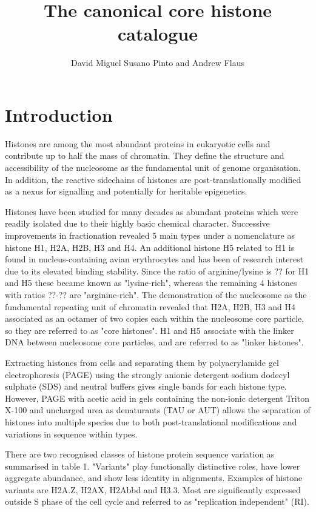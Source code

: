 \documentclass[10pt,a4paper,draft]{article}
\author{David Miguel Susano Pinto and Andrew Flaus}
\title{The canonical core histone catalogue}
\begin{document}
  \maketitle

  \section{Introduction}

Histones are among the most abundant proteins in eukaryotic cells and contribute up to half the mass of chromatin. They define the structure and accessibility of the nucleosome as the fundamental unit of genome organisation. In addition, the reactive sidechains of histones are post-translationally modified as a nexus for signalling and potentially for heritable epigenetics.

Histones have been studied for many decades as abundant proteins which were readily isolated due to their highly basic chemical character. Successive improvements in fractionation revealed 5 main types under a nomenclature as histone H1, H2A, H2B, H3 and H4. An additional histone H5 related to H1 is found in nucleus-containing avian erythrocytes and has been of research interest due to its elevated binding stability. Since the ratio of arginine/lysine is ?? for H1 and H5 these became known as "lysine-rich", whereas the remaining 4 histones with ratios ??-?? are "arginine-rich". The demonstration of the nucleosome as the fundamental repeating unit of chromatin revealed that H2A, H2B, H3 and H4 associated as an octamer of two copies each within the nucleosome core particle, so they are referred to as "core histones". H1 and H5 associate with the linker DNA between nucleosome core particles, and are referred to as "linker histones".

Extracting histones from cells and separating them by polyacrylamide gel electrophoresis (PAGE) using the strongly anionic detergent sodium dodecyl sulphate (SDS) and neutral buffers gives single bands for each histone type. However, PAGE with acetic acid in gels containing the non-ionic detergent Triton X-100 and uncharged urea as denaturants (TAU or AUT) allows the separation of histones into multiple species due to both post-translational modifications and variations in sequence within types.

There are two recognised classes of histone protein sequence variation as summarised in table 1. "Variants" play functionally distinctive roles, have lower aggregate abundance, and show less identity in alignments. Examples of histone variants are H2A.Z, H2AX, H2Abbd and H3.3. Most are significantly expressed outside S phase of the cell cycle and referred to as "replication independent" (RI).
\end{document}
